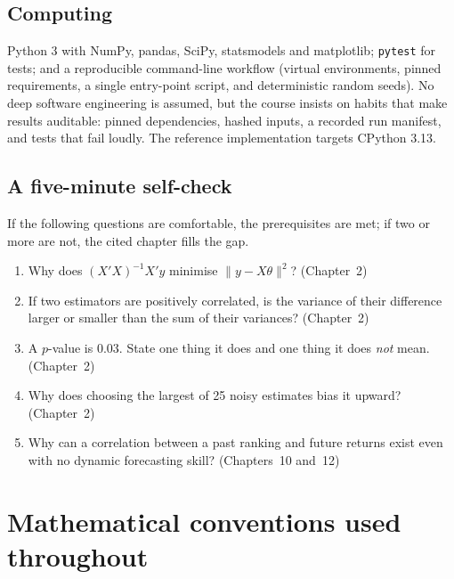 \hypertarget{computing}{%
\subsection{Computing}\label{computing}}

Python 3 with NumPy, pandas, SciPy, statsmodels and matplotlib;
\texttt{pytest} for tests; and a reproducible command-line workflow
(virtual environments, pinned requirements, a single entry-point script,
and deterministic random seeds). No deep software engineering is assumed,
but the course insists on habits that make results auditable: pinned
dependencies, hashed inputs, a recorded run manifest, and tests that fail
loudly. The reference implementation targets CPython 3.13.

\hypertarget{a-five-minute-self-check}{%
\subsection{A five-minute
self-check}\label{a-five-minute-self-check}}

If the following questions are comfortable, the prerequisites are met; if
two or more are not, the cited chapter fills the gap.

\begin{enumerate}
\tightlist
\item
  Why does $(X'X)^{-1}X'y$ minimise $\lVert y-X\theta\rVert^2$? (Chapter~2)
\item
  If two estimators are positively correlated, is the variance of their
  difference larger or smaller than the sum of their variances?
  (Chapter~2)
\item
  A $p$-value is $0.03$. State one thing it does and one thing it does
  \emph{not} mean. (Chapter~2)
\item
  Why does choosing the largest of 25 noisy estimates bias it upward?
  (Chapter~2)
\item
  Why can a correlation between a past ranking and future returns exist
  even with no dynamic forecasting skill? (Chapters~10 and~12)
\end{enumerate}

\hypertarget{mathematical-conventions-used-throughout}{%
\section{Mathematical conventions used
throughout}\label{mathematical-conventions-used-throughout}}

